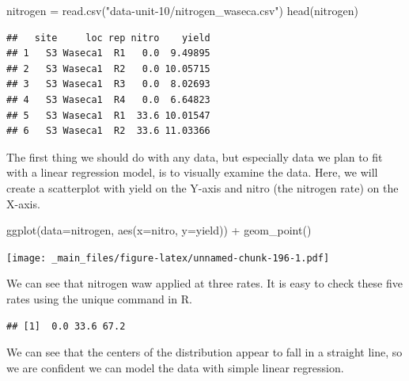 \documentclass[
]{book}
\newenvironment{Shaded}{\begin{snugshade}}{\end{snugshade}}
\newcommand{\AttributeTok}[1]{\textcolor[rgb]{0.77,0.63,0.00}{#1}}
\newcommand{\FunctionTok}[1]{\textcolor[rgb]{0.00,0.00,0.00}{#1}}
\newcommand{\NormalTok}[1]{#1}
\newcommand{\OtherTok}[1]{\textcolor[rgb]{0.56,0.35,0.01}{#1}}
\newcommand{\SpecialCharTok}[1]{\textcolor[rgb]{0.00,0.00,0.00}{#1}}
\newcommand{\StringTok}[1]{\textcolor[rgb]{0.31,0.60,0.02}{#1}}
\begin{document}
\begin{Shaded}
\begin{Highlighting}[]
\NormalTok{nitrogen }\OtherTok{=} \FunctionTok{read.csv}\NormalTok{(}\StringTok{"data{-}unit{-}10/nitrogen\_waseca.csv"}\NormalTok{)}
\FunctionTok{head}\NormalTok{(nitrogen)}
\end{Highlighting}
\end{Shaded}

\begin{verbatim}
##   site     loc rep nitro    yield
## 1   S3 Waseca1  R1   0.0  9.49895
## 2   S3 Waseca1  R2   0.0 10.05715
## 3   S3 Waseca1  R3   0.0  8.02693
## 4   S3 Waseca1  R4   0.0  6.64823
## 5   S3 Waseca1  R1  33.6 10.01547
## 6   S3 Waseca1  R2  33.6 11.03366
\end{verbatim}

The first thing we should do with any data, but especially data we plan to fit with a linear regression model, is to visually examine the data. Here, we will create a scatterplot with yield on the Y-axis and nitro (the nitrogen rate) on the X-axis.

\begin{Shaded}
\begin{Highlighting}[]
\FunctionTok{ggplot}\NormalTok{(}\AttributeTok{data=}\NormalTok{nitrogen, }\FunctionTok{aes}\NormalTok{(}\AttributeTok{x=}\NormalTok{nitro, }\AttributeTok{y=}\NormalTok{yield)) }\SpecialCharTok{+}
  \FunctionTok{geom\_point}\NormalTok{()}
\end{Highlighting}
\end{Shaded}

\texttt{[image: \_main\_files/figure-latex/unnamed-chunk-196-1.pdf]}

We can see that nitrogen waw applied at three rates. It is easy to check these five rates using the unique command in R.

\begin{Shaded}
\end{Shaded}

\begin{verbatim}
## [1]  0.0 33.6 67.2
\end{verbatim}

We can see that the centers of the distribution appear to fall in a straight line, so we are confident we can model the data with simple linear regression.
\end{document}
